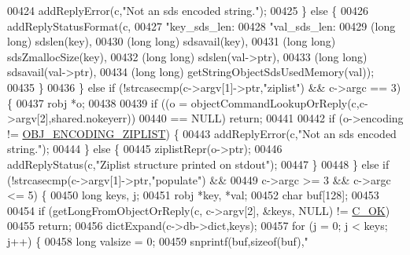 \begin{DoxyCode}
{{{{{{{{{{{{00424             addReplyError(c,\textcolor{stringliteral}{"Not an sds encoded string."});
00425         \} \textcolor{keywordflow}{else} \{
00426             addReplyStatusFormat(c,
00427                 \textcolor{stringliteral}{"key\_sds\_len:%
00428                 \textcolor{stringliteral}{"val\_sds\_len:%
00429                 (\textcolor{keywordtype}{long} \textcolor{keywordtype}{long}) sdslen(key),
00430                 (\textcolor{keywordtype}{long} \textcolor{keywordtype}{long}) sdsavail(key),
00431                 (\textcolor{keywordtype}{long} \textcolor{keywordtype}{long}) sdsZmallocSize(key),
00432                 (\textcolor{keywordtype}{long} \textcolor{keywordtype}{long}) sdslen(val->ptr),
00433                 (\textcolor{keywordtype}{long} \textcolor{keywordtype}{long}) sdsavail(val->ptr),
00434                 (\textcolor{keywordtype}{long} \textcolor{keywordtype}{long}) getStringObjectSdsUsedMemory(val));
00435         \}
00436     \} \textcolor{keywordflow}{else} \textcolor{keywordflow}{if} (!strcasecmp(c->argv[1]->ptr,\textcolor{stringliteral}{"ziplist"}) && c->argc == 3) \{
00437         robj *o;
00438 
00439         \textcolor{keywordflow}{if} ((o = objectCommandLookupOrReply(c,c->argv[2],shared.nokeyerr))
00440                 == NULL) \textcolor{keywordflow}{return};
00441 
00442         \textcolor{keywordflow}{if} (o->encoding != \hyperlink{server_8h_aabf064ede983103f1fd0df2086e84eee}{OBJ\_ENCODING\_ZIPLIST}) \{
00443             addReplyError(c,\textcolor{stringliteral}{"Not an sds encoded string."});
00444         \} \textcolor{keywordflow}{else} \{
00445             ziplistRepr(o->ptr);
00446             addReplyStatus(c,\textcolor{stringliteral}{"Ziplist structure printed on stdout"});
00447         \}
00448     \} \textcolor{keywordflow}{else} \textcolor{keywordflow}{if} (!strcasecmp(c->argv[1]->ptr,\textcolor{stringliteral}{"populate"}) &&
00449                c->argc >= 3 && c->argc <= 5) \{
00450         \textcolor{keywordtype}{long} keys, j;
00451         robj *key, *val;
00452         \textcolor{keywordtype}{char} buf[128];
00453 
00454         \textcolor{keywordflow}{if} (getLongFromObjectOrReply(c, c->argv[2], &keys, NULL) != \hyperlink{server_8h_a303769ef1065076e68731584e758d3e1}{C\_OK})
00455             \textcolor{keywordflow}{return};
00456         dictExpand(c->db->dict,keys);
00457         \textcolor{keywordflow}{for} (j = 0; j < keys; j++) \{
00458             \textcolor{keywordtype}{long} valsize = 0;
00459             snprintf(buf,\textcolor{keyword}{sizeof}(buf),\textcolor{stringliteral}{"%
}}}}}}}}}}}}}}}
\end{DoxyCode}
